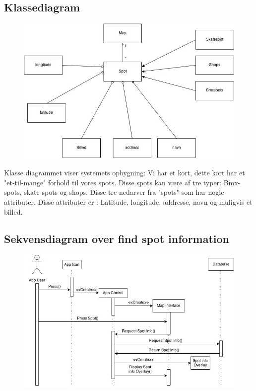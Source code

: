 \documentclass[12pt]{article}
\begin{document}
\subsection*{Klassediagram}
\begin{figure}[h]
\includegraphics[scale = 0.5]{classdiagram}
\end{figure}
Klasse diagrammet viser systemets opbygning:
Vi har et kort, dette kort har et "et-til-mange" forhold til vores spots.
Disse spots kan være af tre typer: Bmx-spots, skate-spots og shops.
Disse tre nedarver fra "spots" som har nogle attributer. Disse attributer er : Latitude, longitude, addresse, navn og muligvis et billed.
\newpage
\subsection*{Sekvensdiagram over find spot information}
\begin{figure}[h]
\includegraphics[scale = 0.5]{sekdia1}
\end{figure}
\end{document}
